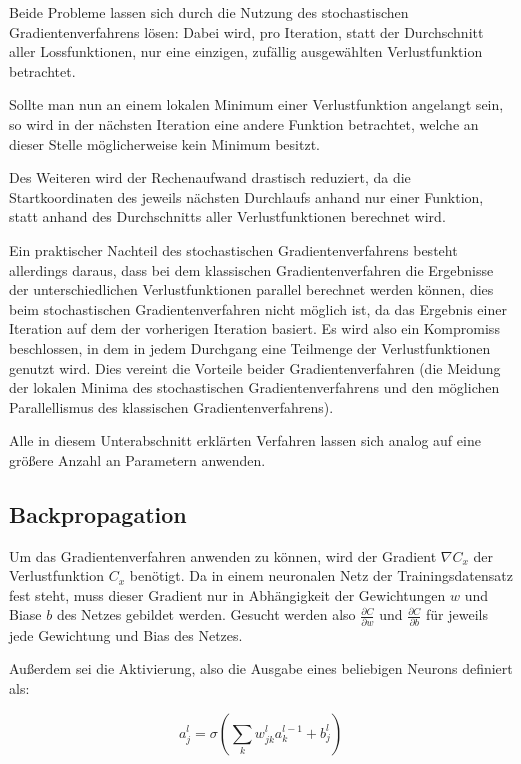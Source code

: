 Beide Probleme lassen sich durch die Nutzung des stochastischen Gradientenverfahrens lösen: Dabei wird, pro Iteration, statt der Durchschnitt aller Lossfunktionen, nur eine einzigen, zufällig ausgewählten Verlustfunktion betrachtet. \cite{kathuria_18}

Sollte man nun an einem lokalen Minimum einer Verlustfunktion angelangt sein, so wird in der nächsten Iteration eine andere Funktion betrachtet, welche an dieser Stelle möglicherweise kein Minimum besitzt.

Des Weiteren wird der Rechenaufwand drastisch reduziert, da die Startkoordinaten des jeweils nächsten Durchlaufs anhand nur einer Funktion, statt anhand des Durchschnitts aller Verlustfunktionen berechnet wird.

Ein praktischer Nachteil des stochastischen Gradientenverfahrens besteht allerdings daraus, dass bei dem klassischen Gradientenverfahren die Ergebnisse der unterschiedlichen Verlustfunktionen parallel berechnet werden können, dies beim stochastischen Gradientenverfahren nicht möglich ist, da das Ergebnis einer Iteration auf dem der vorherigen Iteration basiert. Es wird also ein Kompromiss beschlossen, in dem in jedem Durchgang eine Teilmenge der Verlustfunktionen genutzt wird. \cite{kathuria_18} Dies vereint die Vorteile beider Gradientenverfahren (die Meidung der lokalen Minima des stochastischen Gradientenverfahrens und den möglichen Parallellismus des klassischen Gradientenverfahrens).

Alle in diesem Unterabschnitt erklärten Verfahren lassen sich analog auf eine größere Anzahl an Parametern anwenden.

\subsection{Backpropagation}
\label{ssec:backpropagation}

Um das Gradientenverfahren anwenden zu können, wird der Gradient $\nabla C_x$ der Verlustfunktion $C_x$ benötigt. Da in einem neuronalen Netz der Trainingsdatensatz fest steht, muss dieser Gradient nur in Abhängigkeit der Gewichtungen $w$ und Biase $b$ des Netzes gebildet werden. Gesucht werden also $\frac{\partial C}{\partial w}$ und $\frac{\partial C}{\partial b}$ für jeweils jede Gewichtung und Bias des Netzes.

Außerdem sei die Aktivierung, also die Ausgabe eines beliebigen Neurons definiert als: \cite[Kap.~2]{nielsen_15}

\begin{equation}
a_j^l = \sigma\left(\sum_k w_{jk}^l a_k^{l-1}+b_j^l\right)
\end{equation}

